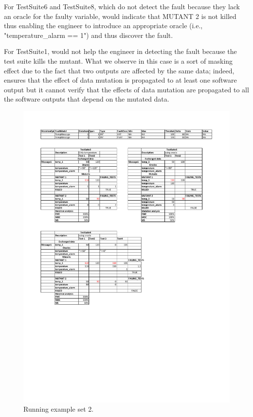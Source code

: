 For TestSuite6 and TestSuite8, which do not detect the fault because they lack an oracle for the faulty variable, \APPR would indicate that MUTANT 2 is not killed thus enabling the engineer to introduce an appropriate oracle (i.e., "temperature\_alarm == 1") and thus discover the fault. 

For TestSuite1, \APPR would not help the engineer in detecting the fault because the test suite kills the mutant. What we observe in this case is a sort of masking effect due to the fact that two outputs are affected by the same data; indeed, \APPR ensures that the effect of data mutation is propagated to at least one software output but it cannot verify that the effects of data mutation are propagated to all the software outputs that depend on the mutated data. 

\begin{figure}[tb]
\centering
\includegraphics[width=14cm]{damat/DataDrivenExample2}
\caption{Running example set 2.}
\label{fig:damat:RunningExample2}
\end{figure}

